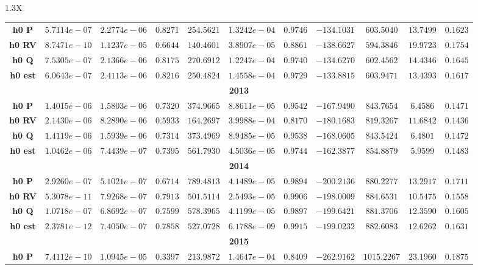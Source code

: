 \documentclass[10pt]{article}
\begin{document}
{\begin{tabularx}{1.3\textwidth}{X}
{\begin{tabular}{ccccccccccc}
 { {\bf h0 P}}& $5.7114e-07$ & $2.2774e-06$ & $0.8271$ & $254.5621$ & $1.3242e-04$ & $0.9746$ & $-134.1031$& $603.5040$& $13.7499$ &$0.1623$\\
 { {\bf h0 RV}}& $8.7471e-10$ & $1.1237e-05$ & $0.6644$ & $140.4601$ & $3.8907e-05$ & $0.8861$ & $-138.6627$& $594.3846$& $19.9723$ &$0.1754$\\
 { {\bf h0 Q}}& $7.5305e-07$ & $2.1366e-06$ & $0.8175$ & $270.6912$ & $1.2247e-04$ & $0.9740$ & $-134.6270$& $602.4562$& $14.4346$ &$0.1645$\\
 { {\bf h0 est}}& $6.0643e-07$ & $2.4113e-06$ & $0.8216$ & $250.4824$ & $1.4558e-04$ & $0.9729$ & $-133.8815$& $603.9471$& $13.4393$ &$0.1617$\\
\bottomrule
\multicolumn{11}{c}{{\bf2013}} \\
\cmidrule(r){1-11} 
 { {\bf h0 P}}& $1.4015e-06$ & $1.5803e-06$ & $0.7320$ & $374.9665$ & $8.8611e-05$ & $0.9542$ & $-167.9490$& $843.7654$& $6.4586$ &$0.1471$\\
 { {\bf h0 RV}}& $2.1430e-06$ & $8.2890e-06$ & $0.5933$ & $164.2697$ & $3.9988e-04$ & $0.8170$ & $-180.1683$& $819.3267$& $11.6842$ &$0.1436$\\
 { {\bf h0 Q}}& $1.4119e-06$ & $1.5939e-06$ & $0.7314$ & $373.4969$ & $8.9485e-05$ & $0.9538$ & $-168.0605$& $843.5424$& $6.4801$ &$0.1472$\\
 { {\bf h0 est}}& $1.0462e-06$ & $7.4439e-07$ & $0.7395$ & $561.7930$ & $4.5036e-05$ & $0.9744$ & $-162.3877$& $854.8879$& $5.9599$ &$0.1483$\\
\bottomrule
\multicolumn{11}{c}{{\bf2014}} \\
\cmidrule(r){1-11} 
 { {\bf h0 P}}& $2.9260e-07$ & $5.1021e-07$ & $0.6714$ & $789.4813$ & $4.1489e-05$ & $0.9894$ & $-200.2136$& $880.2277$& $13.2917$ &$0.1711$\\
 { {\bf h0 RV}}& $5.3078e-11$ & $7.9268e-07$ & $0.7913$ & $501.5114$ & $2.5493e-05$ & $0.9906$ & $-198.0009$& $884.6531$& $10.5475$ &$0.1558$\\
 { {\bf h0 Q}}& $1.0718e-07$ & $6.8692e-07$ & $0.7599$ & $578.3965$ & $4.1199e-05$ & $0.9897$ & $-199.6421$& $881.3706$& $12.3590$ &$0.1605$\\
 { {\bf h0 est}}& $2.3781e-12$ & $7.4050e-07$ & $0.7858$ & $527.0728$ & $6.1788e-09$ & $0.9915$ & $-199.0232$& $882.6083$& $12.6262$ &$0.1631$\\
\bottomrule
\multicolumn{11}{c}{{\bf2015}} \\
\cmidrule(r){1-11} 
 { {\bf h0 P}}& $7.4112e-10$ & $1.0945e-05$ & $0.3397$ & $213.9872$ & $1.4647e-04$ & $0.8409$ & $-262.9162$& $1015.2267$& $23.1960$ &$0.1875$\\

\end{tabular}}
\end{tabularx}}
\end{document}
